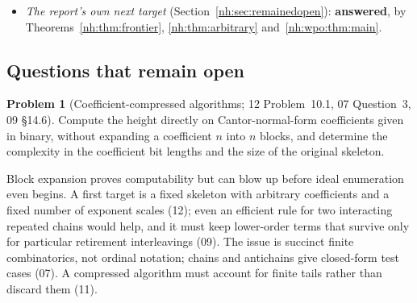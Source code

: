 \documentclass[11pt,a4paper]{article}
\theoremstyle{definition}
\newtheorem{problem}[theorem]{Problem}
\theoremstyle{remark}
\begin{document}
\begin{itemize}
\textbf{partly addressed} by Corollary~\ref{nh:cor:NP}, NP membership of the
threshold problem for the explicit pure-block encoding. A polynomial-time algorithm
or an NP-hardness result, even for two positive scales, would sharpen it; the short
output of Corollary~\ref{nh:cor:smalloutput} does not make the path problem easy.
07 asked in particular about deciding whether the leading or a specified lower
coefficient exceeds a threshold when $Q$ is given only by its order relation and
exponent pattern, before enumerating frontiers; 09 asks whether the uniform case
(largest number of nonempty retirement groups) and the mixed case (a
lexicographically significant coefficient vector) are known ordered-set or
set-system optimization problems, and to separate input-comparison cost from
combinatorial cost before any hardness claim. Any hardness claim needs a separate
reduction, not supplied here.
[Added 29 September 2026, batch 42: the two preceding sentences describe the
state before Part~IV, which \textbf{answers} this item for the hardness
alternative and supplies the reduction. The threshold problem is NP-complete
for height-two skeletons with every fibre $\omega$, one scale
(Theorem~\ref{nh:ur:thm:np}), hence for the pure-block encoding of
Corollary~\ref{nh:cor:NP} (Remark~\ref{nh:ur:rem:partII}); 09's uniform case
is a uniquely restricted matching number, its mixed case an ordered-matching
objective, and 07's leading-coefficient threshold is NP-complete at one scale
(Section~\ref{nh:ur:sec:questions}).]
\item \emph{The report's own next target} (Section~\ref{nh:sec:remainedopen}):
\textbf{answered}, by Theorems~\ref{nh:thm:frontier}, \ref{nh:thm:arbitrary}
and~\ref{nh:wpo:thm:main}.
\end{itemize}

\subsection{Questions that remain open}

\begin{problem}[Coefficient-compressed algorithms; 12 Problem~10.1, 07 Question~3, 09 \S14.6]
\label{nh:prob:compression}
Compute the height directly on Cantor-normal-form coefficients given in binary,
without expanding a coefficient $n$ into $n$ blocks, and determine the complexity
in the coefficient bit lengths and the size of the original skeleton.
\end{problem}
Block expansion proves computability but can blow up before ideal enumeration even
begins. A first target is a fixed skeleton with arbitrary coefficients and a fixed
number of exponent scales (12); even an efficient rule for two interacting
repeated chains would help, and it must keep lower-order terms that survive only
for particular retirement interleavings (09). The issue is succinct finite
combinatorics, not ordinal notation; chains and antichains give closed-form test
cases (07). A compressed algorithm must account for finite tails rather than
discard them (11).
\end{document}
